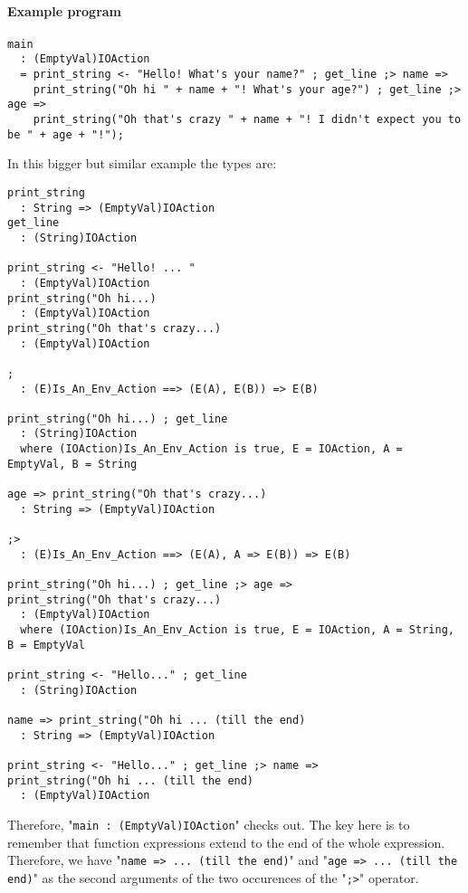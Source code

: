 \documentclass{article}
\begin{document}
\paragraph{Example program}
\begin{verbatim}
main
  : (EmptyVal)IOAction
  = print_string <- "Hello! What's your name?" ; get_line ;> name =>
    print_string("Oh hi " + name + "! What's your age?") ; get_line ;> age =>
    print_string("Oh that's crazy " + name + "! I didn't expect you to be " + age + "!");
\end{verbatim}
In this bigger but similar example the types are:
\begin{verbatim}
print_string
  : String => (EmptyVal)IOAction
get_line
  : (String)IOAction

print_string <- "Hello! ... "
  : (EmptyVal)IOAction
print_string("Oh hi...)
  : (EmptyVal)IOAction
print_string("Oh that's crazy...)
  : (EmptyVal)IOAction

;
  : (E)Is_An_Env_Action ==> (E(A), E(B)) => E(B) 

print_string("Oh hi...) ; get_line
  : (String)IOAction
  where (IOAction)Is_An_Env_Action is true, E = IOAction, A = EmptyVal, B = String

age => print_string("Oh that's crazy...)
  : String => (EmptyVal)IOAction

;>
  : (E)Is_An_Env_Action ==> (E(A), A => E(B)) => E(B) 

print_string("Oh hi...) ; get_line ;> age =>
print_string("Oh that's crazy...)
  : (EmptyVal)IOAction
  where (IOAction)Is_An_Env_Action is true, E = IOAction, A = String, B = EmptyVal

print_string <- "Hello..." ; get_line
  : (String)IOAction

name => print_string("Oh hi ... (till the end)
  : String => (EmptyVal)IOAction

print_string <- "Hello..." ; get_line ;> name =>
print_string("Oh hi ... (till the end)
  : (EmptyVal)IOAction
\end{verbatim}
Therefore, "\texttt{main\ :\ (EmptyVal)IOAction}" checks out.  The key here is
to remember that function expressions extend to the end of the whole
expression. Therefore, we have "\texttt{name => ... (till the end)}" and
"\texttt{age => ... (till the end)}" as the second arguments of the two
occurences of the "\texttt{;>}" operator. 
\end{document}
